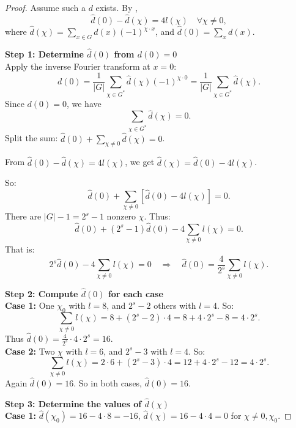 \documentclass[12pt,twoside,]{amsart}
\theoremstyle{plain}
\theoremstyle{definition}
\begin{document}
\begin{proof}

Assume such a \( d \) exists. By ,
\[
\widehat{d}(0) - \widehat{d}(\chi) = 4 l(\chi) \quad \forall \chi \neq 0,
\]
where \( \widehat{d}(\chi) = \sum_{x \in G} d(x) (-1)^{\chi \cdot x} \), and \( \widehat{d}(0) = \sum_{x} d(x) \).

\medskip

\noindent \textbf{Step 1: Determine \( \widehat{d}(0) \) from \( d(0) = 0 \)} \\

Apply the inverse Fourier transform at \( x = 0 \):
\[
d(0) = \frac{1}{|G|} \sum_{\chi \in G^*} \widehat{d}(\chi) (-1)^{\chi \cdot 0} = \frac{1}{|G|} \sum_{\chi \in G^*} \widehat{d}(\chi).
\]
Since \( d(0) = 0 \), we have
\[
\sum_{\chi \in G^*} \widehat{d}(\chi) = 0.
\]
Split the sum: \( \widehat{d}(0) + \sum_{\chi \neq 0} \widehat{d}(\chi) = 0 \).

From \( \widehat{d}(0) - \widehat{d}(\chi) = 4 l(\chi) \), we get \( \widehat{d}(\chi) = \widehat{d}(0) - 4 l(\chi) \).

So:
\[
\widehat{d}(0) + \sum_{\chi \neq 0} \left[ \widehat{d}(0) - 4 l(\chi) \right] = 0.
\]
There are \( |G| - 1 = 2^s - 1 \) nonzero \( \chi \). Thus:
\[
\widehat{d}(0) + (2^s - 1) \widehat{d}(0) - 4 \sum_{\chi \neq 0} l(\chi) = 0.
\]
That is:
\[
2^s \widehat{d}(0) - 4 \sum_{\chi \neq 0} l(\chi) = 0 \quad \Rightarrow \quad \widehat{d}(0) = \frac{4}{2^s} \sum_{\chi \neq 0} l(\chi).
\]

\medskip

\noindent \textbf{Step 2: Compute \( \widehat{d}(0) \) for each case} \\
\textbf{Case 1:}  
One \( \chi_0 \) with \( l = 8 \), and \( 2^s - 2 \) others with \( l = 4 \).  
So:
\[
\sum_{\chi \neq 0} l(\chi) = 8 + (2^s - 2) \cdot 4 = 8 + 4 \cdot 2^s - 8 = 4 \cdot 2^s.
\]
Thus \( \widehat{d}(0) = \frac{4}{2^s} \cdot 4 \cdot 2^s = 16 \). \\
\textbf{Case 2:}  
Two \( \chi \) with \( l = 6 \), and \( 2^s - 3 \) with \( l = 4 \).  
So:
\[
\sum_{\chi \neq 0} l(\chi) = 2 \cdot 6 + (2^s - 3) \cdot 4 = 12 + 4 \cdot 2^s - 12 = 4 \cdot 2^s.
\]
Again \( \widehat{d}(0) = 16 \). So in both cases, \( \widehat{d}(0) = 16 \).

\medskip

\noindent \textbf{Step 3: Determine the values of \( \widehat{d}(\chi) \) } \\

\textbf{Case 1:}  
\( \widehat{d}(\chi_0) = 16 - 4 \cdot 8 = -16 \),  
\( \widehat{d}(\chi) = 16 - 4 \cdot 4 = 0 \) for \( \chi \neq 0, \chi_0 \).


\end{proof}
\end{document}
